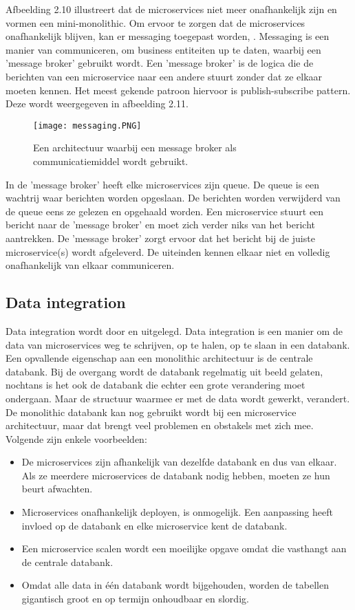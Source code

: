 Afbeelding 2.10 illustreert dat de microservices niet meer onafhankelijk zijn en vormen een mini-monolithic. Om ervoor te zorgen dat de microservices onafhankelijk blijven, kan er messaging toegepast worden, \textcite{Solance2018}. Messaging is een manier van communiceren, om business entiteiten up te daten, waarbij een 'message broker' gebruikt wordt. Een 'message broker' is de logica die de berichten van een microservice naar een andere stuurt zonder dat ze elkaar moeten kennen. Het meest gekende patroon hiervoor is publish-subscribe pattern. Deze wordt weergegeven in afbeelding 2.11.
\begin{figure}[h!]
	\texttt{[image: messaging.PNG]}
	\centering
	\caption{Een architectuur waarbij een message broker als communicatiemiddel wordt gebruikt.}
\end{figure}
In de 'message broker' heeft elke microservices zijn queue. De queue is een wachtrij waar berichten worden opgeslaan. De berichten worden verwijderd van de queue eens ze gelezen en opgehaald worden. 
Een microservice stuurt een bericht naar de 'message broker' en moet zich verder niks van het bericht aantrekken. De 'message broker' zorgt ervoor dat het bericht bij de juiste microservice(s) wordt afgeleverd. De uiteinden kennen elkaar niet en volledig onafhankelijk van elkaar communiceren.

\subsection{Data integration}
Data integration wordt door \textcite{Aradhye2018} en \textcite{Kumar2018} uitgelegd. Data integration is een manier om de data van microservices weg te schrijven, op te halen, op te slaan in een databank.
Een opvallende eigenschap aan een monolithic architectuur is de centrale databank. Bij de overgang wordt de databank regelmatig uit beeld gelaten, nochtans is het ook de databank die echter een grote verandering moet ondergaan. Maar de structuur waarmee er met de data wordt gewerkt, verandert. 
De monolithic databank kan nog gebruikt wordt bij een microservice architectuur, maar  dat brengt veel problemen en obstakels met zich mee. Volgende zijn enkele voorbeelden:
\begin{itemize}
	\item De microservices zijn afhankelijk van dezelfde databank en dus van elkaar. Als ze meerdere microservices de databank nodig hebben, moeten ze hun beurt afwachten.
	\item Microservices onafhankelijk deployen, is onmogelijk. Een aanpassing heeft invloed op de databank en elke microservice kent de databank. 
	\item Een microservice scalen wordt een moeilijke opgave omdat die vasthangt aan de centrale databank. 
	\item Omdat alle data in één databank wordt bijgehouden, worden de tabellen gigantisch groot en op termijn onhoudbaar en slordig. 
\end{itemize}

